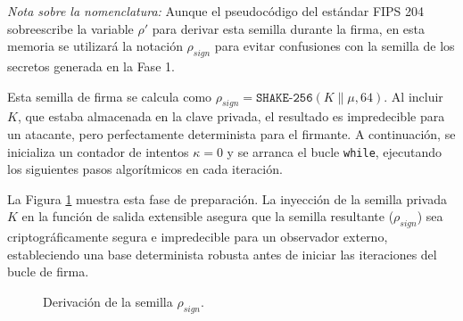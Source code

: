 \documentclass[11pt, a4paper]{report}
\theoremstyle{definition}
\begin{document}
\textit{Nota sobre la nomenclatura:} Aunque el pseudocódigo del estándar FIPS 204 sobreescribe la variable $\rho'$ para derivar esta semilla durante la firma, en esta memoria se utilizará la notación $\rho_{sign}$ para evitar confusiones con la semilla de los secretos generada en la Fase 1.

Esta semilla de firma se calcula como $\rho_{sign} = \texttt{SHAKE-256}(K \parallel \mu, 64)$. Al incluir $K$, que estaba almacenada en la clave privada, el resultado es impredecible para un atacante, pero perfectamente determinista para el firmante. A continuación, se inicializa un contador de intentos $\kappa = 0$ y se arranca el bucle \texttt{while}, ejecutando los siguientes pasos algorítmicos en cada iteración.

La Figura \ref{fig:sign_rho_prima} muestra esta fase de preparación. La inyección de la semilla privada $K$ en la función de salida extensible asegura que la semilla resultante ($\rho_{sign}$) sea criptográficamente segura e impredecible para un observador externo, estableciendo una base determinista robusta antes de iniciar las iteraciones del bucle de firma.

\begin{figure}[H]
    \centering
    \caption{Derivación de la semilla $\rho_{sign}$.}
    \label{fig:sign_rho_prima}
\end{figure}
\end{document}
